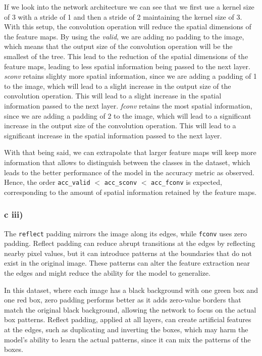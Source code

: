 \documentclass{article}
\begin{document}
If we look into the network architecture we can see that we first use a kernel size of 3 with a stride of 1 and then a stride of 2
maintaining the kernel size of 3. With this setup, the convolution operation will reduce the spatial dimensions
of the feature maps. 
By using the \textit{valid}, we are adding no padding to the image, which means that the output size of the convolution operation
will be the smallest of the tree. This lead to the reduction of the spatial dimensions of the feature maps, leading
to less spatial information being passed to the next layer.
\textit{sconv} retains slighty more spatial information, since we are adding a padding of 1 to the image, which will
lead to a slight increase in the output size of the convolution operation. This will lead to a slight increase in the spatial
information passed to the next layer.
\textit{fconv} retains the most spatial information, since we are adding a padding of 2 to the image, which will
lead to a significant increase in the output size of the convolution operation. This will lead to a significant increase in the spatial
information passed to the next layer.

With that being said, we can extrapolate that larger feature maps will keep more information that allows to distinguish
between the classes in the dataset, which leads to the better performance of the model in the accuracy metric as observed. 
Hence, the order \texttt{acc\_valid} $<$ \texttt{acc\_sconv} $<$ \texttt{acc\_fconv} is expected, corresponding
to the amount of spatial information retained by the feature maps.

\subsubsection*{c iii)}

The \texttt{reflect} padding mirrors the image along its edges, while \texttt{fconv} uses zero padding.
Reflect padding can reduce abrupt transitions at the edges by reflecting nearby pixel values,
but it can introduce patterns at the boundaries that do not exist in the original image.
These patterns can alter the feature extraction near the edges and might reduce the ability for the model to generalize.

In this dataset, where each image has a black background with one green box and one red box, zero padding performs better
as it adds zero-value borders that match the original black background,
allowing the network to focus on the actual box patterns.
Reflect padding, applied at all layers, can create artificial features at the edges, such as duplicating and inverting the boxes,
which may harm the model's ability to learn the actual patterns, since it can mix the patterns of the boxes.
\end{document}
